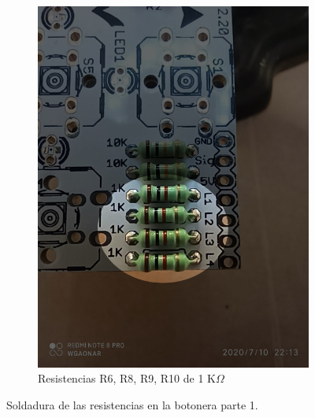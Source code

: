 \documentclass{article}
\begin{document}
\begin{figure}[htbp]
\begin{subfigure}[t]{0.3\textwidth}
        \includegraphics[width=0.9\columnwidth, height=1.2\columnwidth]{images/Botonera/botonera3.jpg}
        \caption{Resistencias R6, R8, R9, R10 de 1 K$\Omega$}
        \label{fig:botonera_resistencias3}
     \end{subfigure}
    \caption{Soldadura de las resistencias en la botonera parte 1.}
    \label{fig:botonera_resistencias_parte1}
\end{figure}
\end{document}
